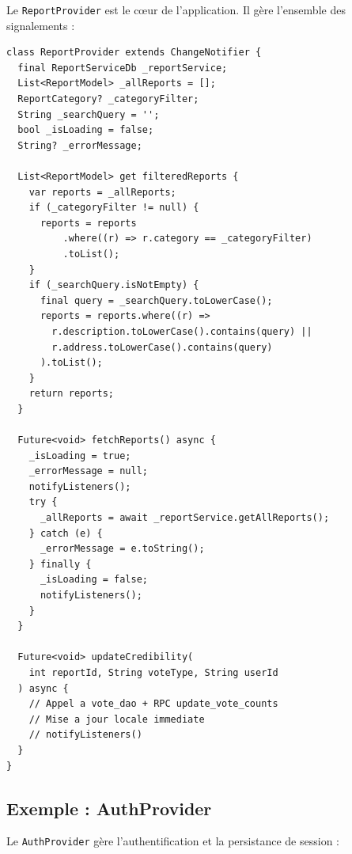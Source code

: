 \documentclass[12pt,a4paper]{report}
\begin{document}
Le \texttt{ReportProvider} est le cœur de l'application. Il gère l'ensemble des signalements :

\begin{lstlisting}[style=codeblock, caption=Extrait de ReportProvider]
class ReportProvider extends ChangeNotifier {
  final ReportServiceDb _reportService;
  List<ReportModel> _allReports = [];
  ReportCategory? _categoryFilter;
  String _searchQuery = '';
  bool _isLoading = false;
  String? _errorMessage;

  List<ReportModel> get filteredReports {
    var reports = _allReports;
    if (_categoryFilter != null) {
      reports = reports
          .where((r) => r.category == _categoryFilter)
          .toList();
    }
    if (_searchQuery.isNotEmpty) {
      final query = _searchQuery.toLowerCase();
      reports = reports.where((r) =>
        r.description.toLowerCase().contains(query) ||
        r.address.toLowerCase().contains(query)
      ).toList();
    }
    return reports;
  }

  Future<void> fetchReports() async {
    _isLoading = true;
    _errorMessage = null;
    notifyListeners();
    try {
      _allReports = await _reportService.getAllReports();
    } catch (e) {
      _errorMessage = e.toString();
    } finally {
      _isLoading = false;
      notifyListeners();
    }
  }

  Future<void> updateCredibility(
    int reportId, String voteType, String userId
  ) async {
    // Appel a vote_dao + RPC update_vote_counts
    // Mise a jour locale immediate
    // notifyListeners()
  }
}
\end{lstlisting}

\subsection{Exemple : AuthProvider}

Le \texttt{AuthProvider} gère l'authentification et la persistance de session :
\end{document}
